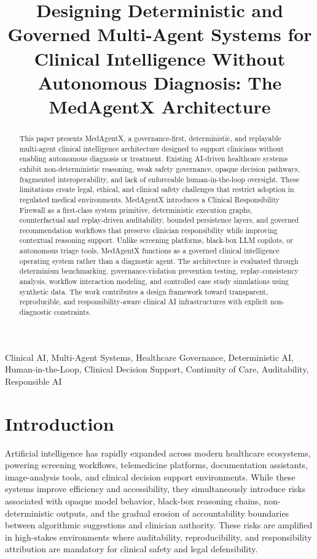 \documentclass[journal]{IEEEtran}
\title{Designing Deterministic and Governed Multi-Agent Systems for Clinical Intelligence Without Autonomous Diagnosis: The MedAgentX Architecture}
\author{
\IEEEauthorblockN{Sahil Mujumdar}
\IEEEauthorblockA{Independent Researcher\\
City, Country\\
Email: mujumdarsahil05@gmail.com}
}
\begin{document}
\maketitle

\begin{abstract}
This paper presents MedAgentX, a governance-first, deterministic, and replayable multi-agent clinical intelligence architecture designed to support clinicians without enabling autonomous diagnosis or treatment. Existing AI-driven healthcare systems exhibit non-deterministic reasoning, weak safety governance, opaque decision pathways, fragmented interoperability, and lack of enforceable human-in-the-loop oversight. These limitations create legal, ethical, and clinical safety challenges that restrict adoption in regulated medical environments. MedAgentX introduces a Clinical Responsibility Firewall as a first-class system primitive, deterministic execution graphs, counterfactual and replay-driven auditability, bounded persistence layers, and governed recommendation workflows that preserve clinician responsibility while improving contextual reasoning support. Unlike screening platforms, black-box LLM copilots, or autonomous triage tools, MedAgentX functions as a governed clinical intelligence operating system rather than a diagnostic agent. The architecture is evaluated through determinism benchmarking, governance-violation prevention testing, replay-consistency analysis, workflow interaction modeling, and controlled case study simulations using synthetic data. The work contributes a design framework toward transparent, reproducible, and responsibility-aware clinical AI infrastructures with explicit non-diagnostic constraints.
\end{abstract}

\begin{IEEEkeywords}
Clinical AI, Multi-Agent Systems, Healthcare Governance, Deterministic AI, Human-in-the-Loop, Clinical Decision Support, Continuity of Care, Auditability, Responsible AI
\end{IEEEkeywords}

\newpage
\section{Introduction}
Artificial intelligence has rapidly expanded across modern healthcare ecosystems, powering screening workflows, telemedicine platforms, documentation assistants, image-analysis tools, and clinical decision support environments. While these systems improve efficiency and accessibility, they simultaneously introduce risks associated with opaque model behavior, black-box reasoning chains, non-deterministic outputs, and the gradual erosion of accountability boundaries between algorithmic suggestions and clinician authority. These risks are amplified in high-stakes environments where auditability, reproducibility, and responsibility attribution are mandatory for clinical safety and legal defensibility.
\end{document}
